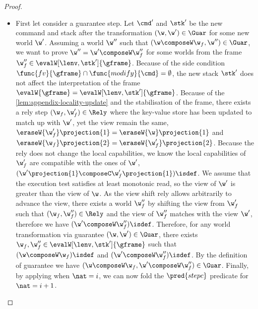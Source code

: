 \begin{proof}
\begin{itemize}
\begin{itemize}
\begin{itemize}
\item First let consider a guarantee step.
Let \( \cmd' \) and \( \stk' \) be the new command and stack after the transformation \( (\w, \w') \in \Guar \) for some new world \( \w'\).
Assuming a world \( \w'' \) such that \( (\w \composeW \w_f, \w'') \in \Guar \), we want to prove \( \w''  = \w' \composeW \w_f'' \) for some worlds from the frame \( \w_f'' \in \evalW[\lenv, \stk']{\gframe} \).
Because of the side condition \( \func{fv}{\gframe} \cap \func{modify}{\cmd} = \emptyset \), the new stack \( \stk' \) does not affect the interpretation of the frame \(\evalW{\gframe} = \evalW[\lenv,\stk']{\gframe}\).
Because of the \cref{lem:appendix-locality-update} and the stabilisation of the frame, there exists a rely step \( (\w_f, \w_{f}') \in \Rely \) where the key-value store has been updated to match up with \( \w' \), yet the view remain the same, \ie \( \eraseW{\w_{f}'}\projection{1} = \eraseW{\w}\projection{1}\) and \( \eraseW{\w_f}\projection{2} = \eraseW{\w'_{f}}\projection{2}\).
Because the rely does not change the local capabilities, we know the local capabilities of \( \w'_{f}\) are compatible with the ones of \( \w' \), \ie \( (\w'\projection{1} \composeC \w'_{f}\projection{1})\isdef\).
We assume that the execution test satisfies at least monotonic read, so the view of \( \w'\) is greater than the view of \( \w \).
As the view shift rely allows arbitrarily to advance the view, there exists a world \( \w_f''\) by shifting the view from \( \w_f' \) such that \( (\w_f, \w_f'') \in \Rely \) and the view of \( \w_f'' \) matches with the view \( \w' \), therefore we have \( (\w' \composeW \w_f'')\isdef \).
Therefore, for any world transformation via guarantee \( (\w, \w') \in \Guar \), there exists \( \w_f, \w_f'' \in \evalW[\lenv,\stk']{\gframe}\)  such that \( (\w \composeW \w_f)\isdef\) and \( (\w' \composeW \w_f'')\isdef\).
By the definition of guarantee we have \( (\w \composeW \w_f, \w' \composeW \w''_f) \in \Guar \).
Finally, by applying \ih when \( \nat = i \), we can now fold the \( \pred{stepc} \) predicate for \( \nat = i + 1 \).


\end{itemize}
\end{itemize}
\end{itemize}
\end{proof}
